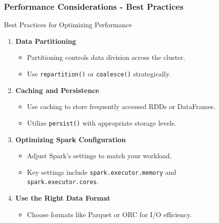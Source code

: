 \documentclass[aspectratio=169]{beamer}
\begin{document}
\begin{frame}[fragile]
    \frametitle{Performance Considerations - Best Practices}
    \begin{block}{Best Practices for Optimizing Performance}
        \begin{enumerate}
            \item \textbf{Data Partitioning}
            \begin{itemize}
                \item Partitioning controls data division across the cluster.
                \item Use \texttt{repartition()} or \texttt{coalesce()} strategically.
            \end{itemize}
            
            \item \textbf{Caching and Persistence}
            \begin{itemize}
                \item Use caching to store frequently accessed RDDs or DataFrames.
                \item Utilize \texttt{persist()} with appropriate storage levels.
            \end{itemize}
            
            \item \textbf{Optimizing Spark Configuration}
            \begin{itemize}
                \item Adjust Spark's settings to match your workload.
                \item Key settings include \texttt{spark.executor.memory} and \texttt{spark.executor.cores}.
            \end{itemize}
            
            \item \textbf{Use the Right Data Format}
            \begin{itemize}
                \item Choose formats like Parquet or ORC for I/O efficiency.
            \end{itemize}
        \end{enumerate}
    \end{block}
\end{frame}
\end{document}
